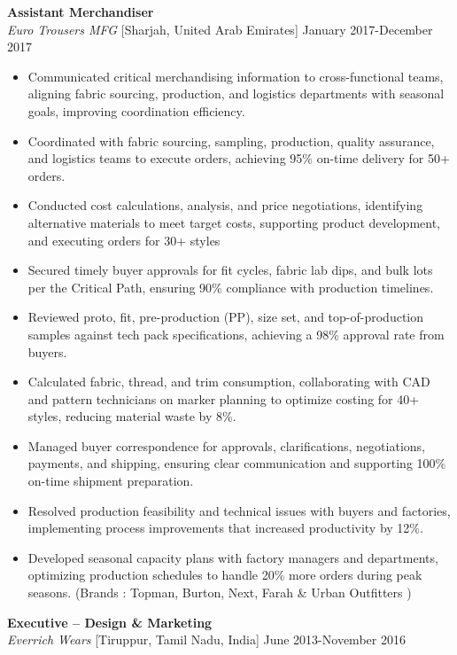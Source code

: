 \documentclass[10pt,letterpaper]{article}
\newcommand{\jobheader}[3]{\textit{#1} \hfill #2 \hfill #3}
\begin{document}
\vspace{6pt}

\textbf{Assistant Merchandiser}\\
\jobheader{Euro Trousers MFG}{[Sharjah, United Arab Emirates]}{January 2017-December 2017}

\begin{itemize}
\item Communicated critical merchandising information to cross-functional teams, aligning fabric sourcing, production, and logistics departments with seasonal goals, improving coordination efficiency.
\item Coordinated with fabric sourcing, sampling, production, quality assurance, and logistics teams to execute orders, achieving 95\% on-time delivery for 50+ orders.
\item Conducted cost calculations, analysis, and price negotiations, identifying alternative materials to meet target costs, supporting product development, and executing orders for 30+ styles
\item Secured timely buyer approvals for fit cycles, fabric lab dips, and bulk lots per the Critical Path, ensuring 90\% compliance with production timelines.
\item Reviewed proto, fit, pre-production (PP), size set, and top-of-production samples against tech pack specifications, achieving a 98\% approval rate from buyers.
\item Calculated fabric, thread, and trim consumption, collaborating with CAD and pattern technicians on marker planning to optimize costing for 40+ styles, reducing material waste by 8\%.
\item Managed buyer correspondence for approvals, clarifications, negotiations, payments, and shipping, ensuring clear communication and supporting 100\% on-time shipment preparation.
\item Resolved production feasibility and technical issues with buyers and factories, implementing process improvements that increased productivity by 12\%.
\item Developed seasonal capacity plans with factory managers and departments, optimizing production schedules to handle 20\% more orders during peak seasons. (Brands : Topman, Burton, Next, Farah \& Urban Outfitters )
\end{itemize}

\vspace{6pt}

\textbf{Executive – Design \& Marketing}\\
\jobheader{Everrich Wears}{[Tiruppur, Tamil Nadu, India]}{June 2013-November 2016}
\end{document}
